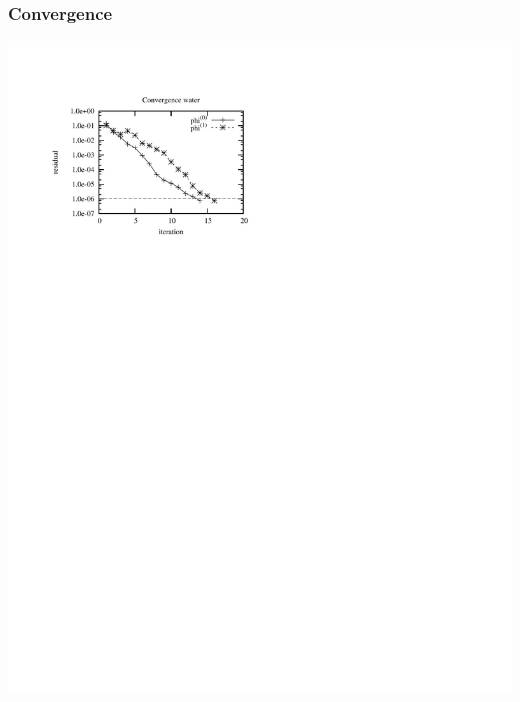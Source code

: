 \begin{frame}
    \frametitle{Convergence}
    \begin{center}
	\includegraphics[scale=1.0, clip, viewport = 50 550 300 730]{figures/response_convergence.pdf}
    \end{center}
\end{frame}

